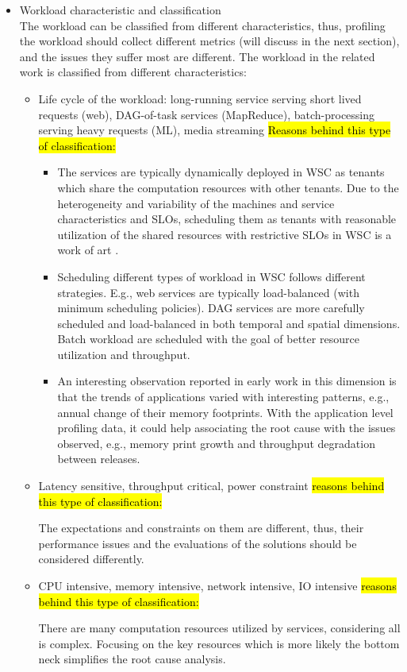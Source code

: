 \begin{itemize}
  \item Workload characteristic and classification \autocite{DBLP:journals/micro/KanevDHRMWB16,DBLP:journals/micro/RenTMSRH10,DBLP:conf/bigdataconf/LuYXXB17,DBLP:conf/cluster/DiKC12}\\
  The workload can be classified from different characteristics, thus, profiling the workload should collect different metrics (will discuss in the next section), and the issues they suffer most are different.
  The workload in the related work is classified from different characteristics:
    \begin{itemize}
      \item Life cycle of the workload: long-running service serving short lived requests (web), DAG-of-task services (MapReduce), batch-processing serving heavy requests (ML), media streaming
       \hl{Reasons behind this type of classification:}
          \begin{itemize}
            \item The services are typically dynamically deployed in WSC as tenants which share the computation resources with other tenants. Due to the heterogeneity and variability of the machines and service characteristics and SLOs, scheduling them as tenants with reasonable utilization of the shared resources with restrictive SLOs in WSC is a work of art \autocite{DBLP:conf/asplos/FerdmanAKVAJKPAF12, DBLP:journals/micro/KanevDHRMWB16, DBLP:conf/iwqos/GuoCWDFMB19}.
            \item Scheduling different types of workload in WSC follows different strategies. E.g., web services are typically load-balanced (with minimum scheduling policies). DAG services are more carefully scheduled and load-balanced in both temporal and spatial dimensions. Batch workload are scheduled with the goal of better resource utilization and throughput.
            \item An interesting observation reported in early work in this dimension is that the trends of applications varied with interesting patterns, e.g., annual change of their memory footprints. With the application level profiling data, it could help associating the root cause with the issues observed, e.g., memory print growth and throughput degradation between releases.
          \end{itemize}
      \item Latency sensitive, throughput critical, power constraint
        \hl{reasons behind this type of classification:}

        The expectations and constraints on them are different, thus, their performance issues and the evaluations of the solutions should be considered differently.
      \item CPU intensive, memory intensive, network intensive, IO intensive
        \hl{reasons behind this type of classification:}

        There are many computation resources utilized by services, considering all is complex. Focusing on the key resources which is more likely the bottom neck simplifies the root cause analysis.
    \end{itemize}
\end{itemize}


